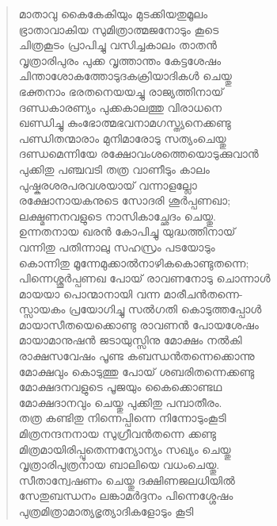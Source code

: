 \begin{verse}
മാതാവു കൈകേകിയും മുടക്കിയതുമൂലം\\
ഭ്രാതാവാകിയ സുമിത്രാത്മജനോടും കൂടെ\\
ചിത്രകൂടം പ്രാപിച്ചു വസിച്ചകാലം താതന്‍\\
വൃത്രാരിപുരം പുക്ക വൃത്താന്തം കേട്ടശേഷം\\
ചിന്താശോകത്തോടുദകക്രിയാദികള്‍ ചെയ്തു\\
ഭക്തനാം ഭരതനെയയച്ചു രാജ്യത്തിനായ്\\
ദണ്ഡകാരണ്യം പുക്കകാലത്തു വിരാധനെ\\
ഖണ്ഡിച്ചു കുംഭോത്മഭവനാമഗസ്ത്യനെക്കണ്ടു\\
പണ്ഡിതന്മാരാം മുനിമാരോടു സത്യംചെയ്തു\\
ദണ്ഡമെന്നിയേ രക്ഷോവംശത്തെയൊടുക്കുവാന്‍\\
പുക്കിതു പഞ്ചവടി തത്ര വാണീടും കാലം\\
പുഷ്കരശരപരവശയായ് വന്നാളല്ലോ\\
രക്ഷോനായകനുടെ സോദരി ശൂര്‍പ്പണഖാ;\\
ലക്ഷ്മണനവളുടെ നാസികാച്ഛേദം ചെയ്തു.\\
ഉന്നതനായ ഖരന്‍ കോപിച്ചു യുദ്ധത്തിനായ്\\
വന്നിതു പതിന്നാലു സഹസ്രം പടയോടും\\
കൊന്നിതു മൂന്നേമുക്കാല്‍നാഴികകൊണ്ടുതന്നെ;\\
പിന്നെശ്ശൂര്‍പ്പണഖ പോയ് രാവണനോടു ചൊന്നാള്‍\\
മായയാ പൊന്മാനായി വന്ന മാരീചന്‍തന്നെ-\\
സ്സായകം പ്രയോഗിച്ചു സല്‍ഗതി കൊടുത്തപ്പോള്‍\\
മായാസീതയെക്കൊണ്ടു രാവണന്‍ പോയശേഷം\\
മായാമാനുഷന്‍ ജടായുസ്സിനു മോക്ഷം നല്‍കി\\
രാക്ഷസവേഷം പൂണ്ട കബന്ധന്‍തന്നെക്കൊന്നു\\
മോക്ഷവും കൊടുത്തു പോയ് ശബരിതന്നെക്കണ്ടു\\
മോക്ഷദനവളുടെ പൂജയും കൈക്കൊണ്ടഥ\\
മോക്ഷദാനവും ചെയ്തു പുക്കിതു പമ്പാതീരം.\\
തത്ര കണ്ടിതു നിന്നെപ്പിന്നെ നിന്നോടുംകൂടി\\ 
മിത്രനന്ദനനായ സുഗ്രീവന്‍തന്നെ ക്കണ്ടു\\
മിത്രമായിരിപ്പൂതെന്നന്യോന്യം സഖ്യം ചെയ്തു\\
വൃത്രാരിപുത്രനായ ബാലിയെ വധംചെയ്തു.\\
സീതാന്വേഷണം ചെയ്തു ദക്ഷിണജലധിയില്‍\\
സേതുബന്ധനം ലങ്കാമര്‍ദ്ദനം പിന്നെശ്ശേഷം\\
പുത്രമിത്രാമാത്യഭൃത്യാദികളോടും കൂടി\\

\end{verse}
